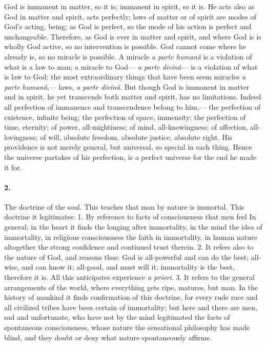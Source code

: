 \documentclass[12pt]{article}
\begin{document}
God is immanent in matter, so it is; immanent in spirit, so it is. He acts also as God in matter and spirit, acts perfectly; laws of matter or of spirit are modes of God's acting, being; as God is perfect, so the mode of his action is perfect and unchangeable. Therefore, as God is ever in matter and spirit, and where God is is wholly God active, so no intervention is possible. God cannot come where he already is, so no miracle is possible. A miracle \emph{a parte human\^{a}} is a violation of what is a law to man; a miracle to God--- \emph{a parte divin\^{a}}--- is a violation of what is law to God: the most extraordinary things that have been seem miracles \emph{a parte human\^{a}},--- laws, \emph{a parte divin\^{a}}. But though God is immanent in matter and in spirit, he yet transcends both matter and spirit, has no limitations. Indeed all perfection of immanence and transcendence belong to him,--- the perfection of existence, infinite being; the perfection of space, immensity; the perfection of time, eternity; of power, all-mightiness; of mind, all-knowingness; of affection, all-lovingness; of will, absolute freedom, absolute justice, absolute right. His providence is not merely general, but universal, so special in each thing. Hence the universe partakes of his perfection, is a perfect universe for the end he made it for. 

\paragraph{2.} The doctrine of the soul. This teaches that man by nature is immortal. This doctrine it legitimates: 1. By reference to facts of consciousness that men feel In general; in the heart it finds the longing after immortality, in the mind the idea of immortality, in religious consciousness the faith in immortality, in human nature altogether the strong confidence and continued trust therein. 2. It refers also to the nature of God, and reasons thus: God is all-powerful and can do the best; all-wise, and can know it; all-good, and must will it; immortality is the best, therefore it is. All this anticipates experience \emph{a priori}. 3. It refers to the general arrangements of the world, where everything gets ripe, matures, but man. In the history of mankind it finds confirmation of this doctrine, for every rude race and all civilized tribes have been certain of immortality; but here and there are men, sad and unfortunate, who have not by the mind legitimated the facts of spontaneous consciousness, whose nature the sensational philosophy has made blind, and they doubt or deny what nature spontaneously affirms. 
\end{document}
